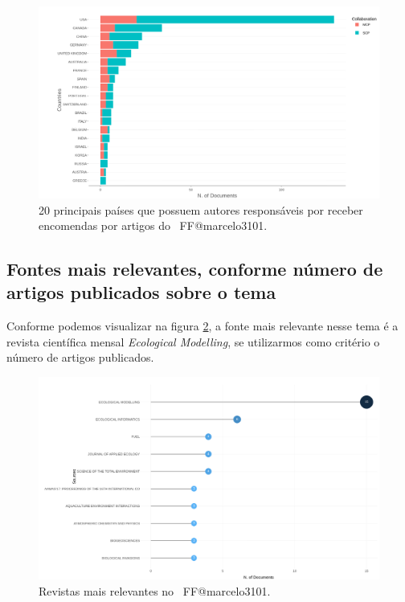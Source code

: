 \begin{figure}
    \centering
    \includegraphics[width=1\textwidth]{exploratory-data-analysis/marcelo3101/PesqBibliogr/ForestFire/WoS-20221204/assets/CorrespondingAuthorsCountryFFmarcelo3101.png}
    \caption{20 principais países que possuem autores responsáveis por receber encomendas por artigos do \dataset\ FF@marcelo3101.}
    \label{fig:FF@marcelo3101:Corresponding-Authors-Country}
\end{figure}

\subsection{Fontes mais relevantes, conforme número de artigos publicados sobre o tema}

Conforme podemos visualizar na figura \ref{fig:FF@marcelo3101:Most-Relevant-Sources}, a fonte mais relevante nesse tema é a revista científica mensal \textit{Ecological Modelling}, se utilizarmos como critério o número de artigos publicados.

\begin{figure}
    \centering
    \includegraphics[width=1\textwidth]{exploratory-data-analysis/marcelo3101/PesqBibliogr/ForestFire/WoS-20221204/assets/mostRelevantSourcesFFmarcelo3101.png}
    \caption{Revistas mais relevantes no  \dataset\ FF@marcelo3101.}
    \label{fig:FF@marcelo3101:Most-Relevant-Sources}
\end{figure}

